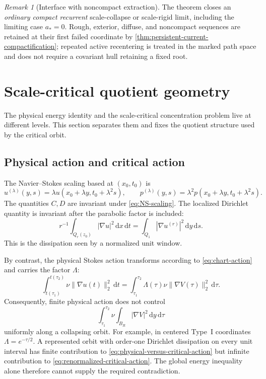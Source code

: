 \documentclass[11pt]{amsart}
\numberwithin{equation}{section}
\theoremstyle{plain}
\theoremstyle{definition}
\theoremstyle{remark}
\newtheorem{remark}[remark]{Remark}
\newcommand{\dd}{\,\mathrm d}
\begin{document}
\begin{remark}[Interface with noncompact extraction]
\label{rem:remaining-recurrent-extraction}
The theorem closes an \emph{ordinary compact recurrent} scale-collapse or
scale-rigid limit, including the limiting case \(a_*=0\).  Rough, exterior,
diffuse, and noncompact sequences are retained at their first failed
coordinate by \cref{thm:persistent-current-compactification}; repeated active
recentering is treated in the marked path space and does not require a
covariant hull retaining a fixed root.
\end{remark}

\section{Scale-critical quotient geometry}
\label{sec:quotient-geometry}

The physical energy identity and the scale-critical concentration problem
live at different levels.  This section separates them and fixes the quotient
structure used by the critical orbit.

\subsection{Physical action and critical action}

The Navier--Stokes scaling based at \((x_0,t_0)\) is
\begin{equation}\label{eq:NS-scaling}
 u^{(\lambda)}(y,s)
 =\lambda u(x_0+\lambda y,t_0+\lambda^2s),
 \qquad
 p^{(\lambda)}(y,s)
 =\lambda^2p(x_0+\lambda y,t_0+\lambda^2s).
\end{equation}
The quantities \(C,D\) are invariant under \eqref{eq:NS-scaling}.  The
localized Dirichlet quantity is invariant after the parabolic factor is
included:
\begin{equation}\label{eq:critical-dirichlet-scaling}
 r^{-1}\int_{Q_r(z_0)}|\nabla u|^2\dd x\dd t
 =\int_{Q_1}|\nabla u^{(r)}|^2\dd y\dd s.
\end{equation}
This is the dissipation seen by a normalized unit window.

By contrast, the physical Stokes action transforms according to
\eqref{eq:chart-action} and carries the factor \(\Lambda\):
\begin{equation}\label{eq:physical-versus-critical-action}
 \int_{t(\tau_1)}^{t(\tau_2)}
 \nu\|\nabla u(t)\|_2^2\dd t
 =\int_{\tau_1}^{\tau_2}\Lambda(\tau)
 \nu\|\nabla V(\tau)\|_2^2\dd\tau.
\end{equation}
Consequently, finite physical action does not control
\begin{equation}\label{eq:renormalized-critical-action}
 \int_{\tau_1}^{\tau_2}\nu
 \int_{B_R}|\nabla V|^2\dd y\dd\tau
\end{equation}
uniformly along a collapsing orbit.  For example, in centered Type~I
coordinates \(\Lambda=e^{-\tau/2}\).  A represented orbit with order-one
Dirichlet dissipation on every unit interval has finite contribution to
\eqref{eq:physical-versus-critical-action} but infinite contribution to
\eqref{eq:renormalized-critical-action}.  The global energy inequality alone
therefore cannot supply the required contradiction.
\end{document}

